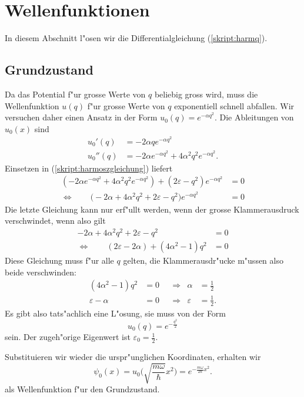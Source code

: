 \section{Wellenfunktionen}
In diesem Abschnitt l"osen wir die Differentialgleichung (\ref{skript:harmq}).
\subsection{Grundzustand\label{skript:hogrundzustand}}
Da das Potential f"ur grosse Werte von $q$ beliebig gross wird,
muss die Wellenfunktion $u(q)$ f"ur grosse Werte von $q$ exponentiell
schnell abfallen.
Wir versuchen daher einen Ansatz in der Form $u_0(q)=e^{-\alpha q^2}$.
Die Ableitungen von
$u_0(x)$ sind
\begin{align*}
u_0'(q)&=-2\alpha qe^{-\alpha q^2}\\
u_0''(q)&=-2\alpha e^{-\alpha q^2}+4\alpha^2q^2e^{-\alpha q^2}.
\end{align*}
Einsetzen in (\ref{skript:harmoszgleichung})  liefert
\begin{align*}
(-2\alpha e^{-\alpha q^2}+4\alpha^2q^2e^{-\alpha q^2})
+
(2\varepsilon - q^2)e^{-\alpha q^2}&=0
\\
\Leftrightarrow\qquad
\biggl(
-2\alpha +4\alpha^2q^2
+
2\varepsilon - q^2
\biggr)e^{-\alpha q^2}
&=0
\end{align*}
Die letzte Gleichung kann nur erf"ullt werden, wenn der grosse Klammerausdruck
verschwindet, wenn also gilt
\begin{align*}
-2\alpha +4\alpha^2q^2
+
2\varepsilon - q^2
&=0
\\
\Leftrightarrow\qquad
(2\varepsilon-2\alpha)
+
(4\alpha^2-1)q^2
&=0
\end{align*}
Diese Gleichung muss f"ur alle $q$ gelten, die Klammerausdr"ucke
m"ussen also beide verschwinden:
\begin{align*}
(4\alpha^2-1)q^2&=0
&
&\Rightarrow&
\alpha&=\frac12
\\
\varepsilon-\alpha&=0
&
&\Rightarrow&
\varepsilon&=\frac12.
\end{align*}
Es gibt also tats"achlich eine L"osung, sie muss von der Form
\[
u_0(q)=e^{-\frac{q^2}2}
\]
sein. Der zugeh"orige Eigenwert ist $\varepsilon_0=\frac12$.

Substituieren wir wieder die
urspr"unglichen Koordinaten, erhalten wir
\begin{equation}
\psi_0(x)=u_0\biggl(\sqrt{\frac{m\omega}{\hbar}}x^2\biggr)
=
e^{-\frac{m\omega}{2\hbar}x^2}.
\label{skript:grundzustandwellenfunktion}
\end{equation}
als Wellenfunktion f"ur den Grundzustand.


